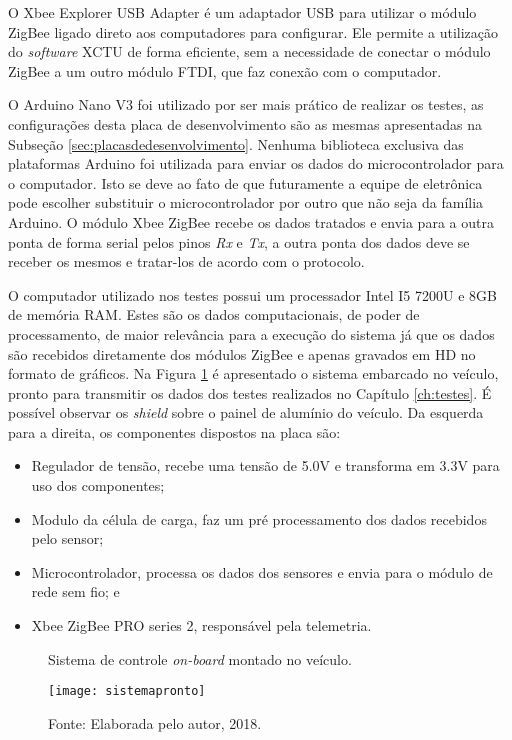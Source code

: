 O Xbee Explorer USB Adapter\cite{explorer} é um adaptador USB para utilizar o módulo ZigBee ligado direto aos computadores para configurar. Ele permite a utilização do \textit{software} XCTU de forma eficiente, sem a necessidade de conectar o módulo ZigBee a um outro módulo FTDI\cite{ftdi}, que faz conexão com o computador. 

O Arduino Nano V3 foi utilizado por ser mais prático de realizar os testes, as configurações desta placa de desenvolvimento são as mesmas apresentadas na Subseção \ref{sec:placasdedesenvolvimento}. Nenhuma biblioteca exclusiva das plataformas Arduino foi utilizada para enviar os dados do microcontrolador para o computador. Isto se deve ao fato de que futuramente a equipe de eletrônica pode escolher substituir o microcontrolador por outro que não seja da família Arduino. O módulo Xbee ZigBee recebe os dados tratados e envia para a outra ponta de forma serial pelos pinos \textit{Rx} e \textit{Tx}, a outra ponta dos dados deve se receber os mesmos e tratar-los de acordo com o protocolo.

O computador utilizado nos testes possui um processador Intel I5 7200U e 8GB de memória RAM. Estes são os dados computacionais, de poder de processamento, de maior relevância para a execução do sistema já que os dados são recebidos diretamente dos módulos ZigBee e apenas gravados em HD no formato de gráficos. Na Figura \ref{fig:sistemapronto} é apresentado o sistema embarcado no veículo, pronto para transmitir os dados dos testes realizados no Capítulo \ref{ch:testes}. É possível observar os \textit{shield} sobre o painel de alumínio do veículo. Da esquerda para a direita, os componentes dispostos na placa são:

\begin{itemize}
	\item Regulador de tensão, recebe uma tensão de 5.0V e transforma em 3.3V para uso dos componentes;
	\item Modulo da célula de carga, faz um pré processamento dos dados recebidos pelo sensor;
	\item Microcontrolador, processa os dados dos sensores e envia para o módulo de rede sem fio; e
	\item Xbee ZigBee PRO series 2, responsável pela telemetria.
\end{itemize}


\begin{figure}[!htb]
	\centering
		\caption{Sistema de controle \textit{on-board} montado no veículo.}
		\texttt{[image: sistemapronto]} 
		\caption*{Fonte: Elaborada pelo autor, 2018.}
		\label{fig:sistemapronto}
\end{figure}    


